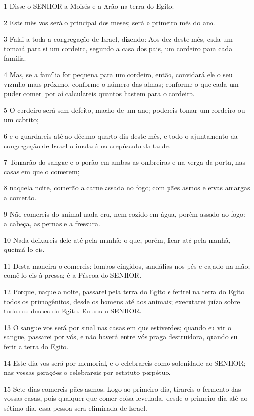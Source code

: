 \par 1 Disse o SENHOR a Moisés e a Arão na terra do Egito:
\par 2 Este mês vos será o principal dos meses; será o primeiro mês do ano.
\par 3 Falai a toda a congregação de Israel, dizendo: Aos dez deste mês, cada um tomará para si um cordeiro, segundo a casa dos pais, um cordeiro para cada família.
\par 4 Mas, se a família for pequena para um cordeiro, então, convidará ele o seu vizinho mais próximo, conforme o número das almas; conforme o que cada um puder comer, por aí calculareis quantos bastem para o cordeiro.
\par 5 O cordeiro será sem defeito, macho de um ano; podereis tomar um cordeiro ou um cabrito;
\par 6 e o guardareis até ao décimo quarto dia deste mês, e todo o ajuntamento da congregação de Israel o imolará no crepúsculo da tarde.
\par 7 Tomarão do sangue e o porão em ambas as ombreiras e na verga da porta, nas casas em que o comerem;
\par 8 naquela noite, comerão a carne assada no fogo; com pães asmos e ervas amargas a comerão.
\par 9 Não comereis do animal nada cru, nem cozido em água, porém assado ao fogo: a cabeça, as pernas e a fressura.
\par 10 Nada deixareis dele até pela manhã; o que, porém, ficar até pela manhã, queimá-lo-eis.
\par 11 Desta maneira o comereis: lombos cingidos, sandálias nos pés e cajado na mão; comê-lo-eis à pressa; é a Páscoa do SENHOR.
\par 12 Porque, naquela noite, passarei pela terra do Egito e ferirei na terra do Egito todos os primogênitos, desde os homens até aos animais; executarei juízo sobre todos os deuses do Egito. Eu sou o SENHOR.
\par 13 O sangue vos será por sinal nas casas em que estiverdes; quando eu vir o sangue, passarei por vós, e não haverá entre vós praga destruidora, quando eu ferir a terra do Egito.
\par 14 Este dia vos será por memorial, e o celebrareis como solenidade ao SENHOR; nas vossas gerações o celebrareis por estatuto perpétuo.
\par 15 Sete dias comereis pães asmos. Logo ao primeiro dia, tirareis o fermento das vossas casas, pois qualquer que comer coisa levedada, desde o primeiro dia até ao sétimo dia, essa pessoa será eliminada de Israel.
